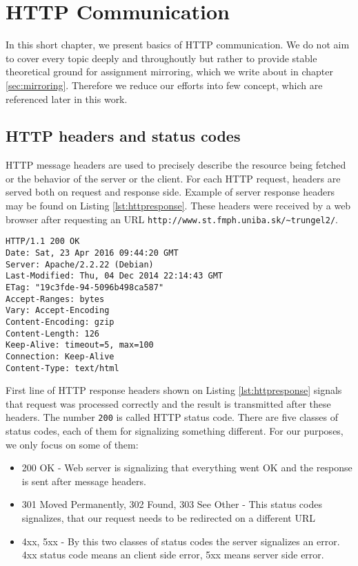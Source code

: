 \chapter{HTTP Communication}

In this short chapter, we present basics of HTTP communication. We do not aim to cover every topic deeply and throughoutly but rather to provide stable theoretical ground for assignment mirroring, which we write about in chapter \ref{sec:mirroring}.
Therefore we reduce our efforts into few  concept, which are referenced later in this work.

\section{HTTP headers and status codes}
HTTP message headers are used to precisely describe the resource being fetched or the behavior of the server or the client. \cite{mozzila} For each HTTP request, headers are served both on request and response side. Example of server response headers may be found on Listing \ref{lst:httpresponse}. These headers were received by a web browser after requesting an URL \texttt{http://www.st.fmph.uniba.sk/\textasciitilde trungel2/}.

\begin{lstlisting}[caption={Http response headers},label={lst:httpresponse}]
HTTP/1.1 200 OK
Date: Sat, 23 Apr 2016 09:44:20 GMT
Server: Apache/2.2.22 (Debian)
Last-Modified: Thu, 04 Dec 2014 22:14:43 GMT
ETag: "19c3fde-94-5096b498ca587"
Accept-Ranges: bytes
Vary: Accept-Encoding
Content-Encoding: gzip
Content-Length: 126
Keep-Alive: timeout=5, max=100
Connection: Keep-Alive
Content-Type: text/html
\end{lstlisting}

First line of HTTP response headers shown on Listing \ref{lst:httpresponse} signals that request was processed correctly and the result is transmitted after these headers. The number \texttt{200} is called HTTP status code. There are five classes of status codes, each of them for signalizing something different. For our purposes, we only focus on some of them:

\begin{itemize}
\item 200 OK - Web server is signalizing that everything went OK and the response is sent after message headers.
\item 301 Moved Permanently, 302 Found, 303 See Other - This status codes signalizes, that our request needs to be redirected on a different URL
\item 4xx, 5xx - By this two classes of status codes the server signalizes an error. 4xx status code means an client side error, 5xx means server side error.
\end{itemize} 

